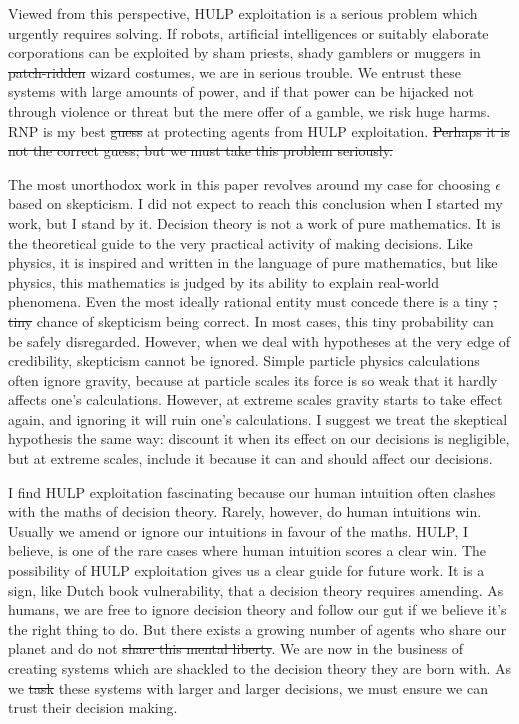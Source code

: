 \documentclass{article}
\providecommand{\DIFadd}[1]{{\protect\color{blue}\uwave{#1}}} %
\providecommand{\DIFdel}[1]{{\protect\color{red}\sout{#1}}}                      %
\providecommand{\DIFaddbegin}{} %
\providecommand{\DIFaddend}{} %
\providecommand{\DIFdelbegin}{} %
\providecommand{\DIFdelend}{} %
\begin{document}
Viewed from this perspective, HULP exploitation is a serious problem which urgently requires solving. If robots, artificial intelligences or suitably elaborate corporations can be exploited by sham priests, shady gamblers or muggers in \DIFdelbegin \DIFdel{patch-ridden }\DIFdelend wizard costumes, we are in serious trouble. We entrust these systems with large amounts of power, and if that power can be hijacked not through violence or threat but the mere offer of a gamble, we risk huge harms. RNP is my best \DIFdelbegin \DIFdel{guess }\DIFdelend \DIFaddbegin \DIFadd{shot }\DIFaddend at protecting agents from HULP exploitation.
\DIFdelbegin \DIFdel{Perhaps it is not the correct guess; but we must take this problem seriously.
}\DIFdelend 

The most unorthodox work in this paper revolves around my case for choosing \(\epsilon\) based on skepticism. I did not expect to reach this conclusion when I started my work, but I stand by it. Decision theory is not a work of pure mathematics. It is the theoretical guide to the very practical activity of making decisions. Like physics, it is inspired and written in the language of pure mathematics, but like physics, this mathematics is judged by its ability to explain real-world phenomena. Even the most ideally rational entity must concede there is a tiny \DIFdelbegin \DIFdel{, tiny }\DIFdelend chance of skepticism being correct. In most cases, this tiny probability can be safely disregarded. However, when we deal with hypotheses at the very edge of credibility, skepticism cannot be ignored. Simple particle physics calculations often ignore gravity, because at particle scales its force is so weak that it hardly affects one's calculations. However, at extreme scales gravity starts to take effect again, and ignoring it will ruin one's calculations. I suggest we treat the skeptical hypothesis the same way: discount it when its effect on our decisions is negligible, but at extreme scales, include it because it can and should affect our decisions.

I find HULP exploitation fascinating because our human intuition often clashes with the maths of decision theory. Rarely, however, do human intuitions win. Usually we amend or ignore our intuitions in favour of the maths. HULP, I believe, is one of the rare cases where human intuition scores a clear win. The possibility of HULP exploitation gives us a clear guide for future work. It is a sign, like Dutch book vulnerability, that a decision theory requires amending. As humans, we are free to ignore decision theory and follow our gut if we believe it's the right thing to do. But there exists a growing number of agents who share our planet and do not \DIFdelbegin \DIFdel{share this mental liberty}\DIFdelend \DIFaddbegin \DIFadd{have this capacity}\DIFaddend . We are now in the business of creating systems which are shackled to the decision theory they are born with. As we \DIFdelbegin \DIFdel{task }\DIFdelend \DIFaddbegin \DIFadd{trust }\DIFaddend these systems with larger and larger decisions, we must ensure we can trust their decision making.


\DIFdelbegin %
\DIFdelend \DIFaddbegin 
\DIFaddend 
\end{document}
